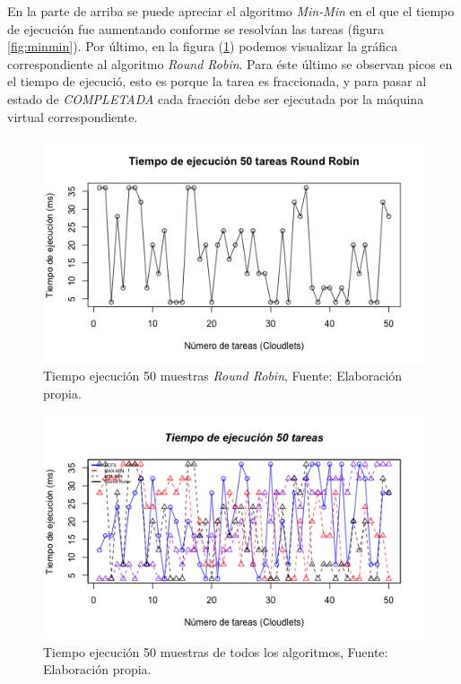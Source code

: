 En la parte de arriba se puede apreciar el algoritmo \textit{Min-Min} en el que el tiempo de ejecuci\'on fue aumentando conforme se resolv\'ian las tareas (figura \ref{fig:minmin}). Por último, en la figura (\ref{fig:roundrobin}) podemos visualizar la gráfica correspondiente al algoritmo \textit{Round Robin}. Para éste último se observan picos en el tiempo de ejecució, esto es porque la tarea es fraccionada, y para pasar al estado de \textit{COMPLETADA} cada fracción debe ser ejecutada por la máquina virtual correspondiente.


\renewcommand\thefigure{\arabic{figure}}
\begin{figure}[h!] 
	\centering
	\includegraphics[scale=0.6]{media/roundrobin}
	\caption{Tiempo ejecuci\'on 50 muestras \textit{Round Robin}, Fuente: Elaboraci\'on propia.}
	\label{fig:roundrobin}
\end{figure}

\newpage




\renewcommand\thefigure{\arabic{figure}}
\begin{figure}[h!] 
	\centering
	\includegraphics[scale=0.7]{media/figure}
	\caption{Tiempo ejecuci\'on 50 muestras de todos los algoritmos, Fuente: Elaboraci\'on propia.}
	\label{fig:figure}
\end{figure}

